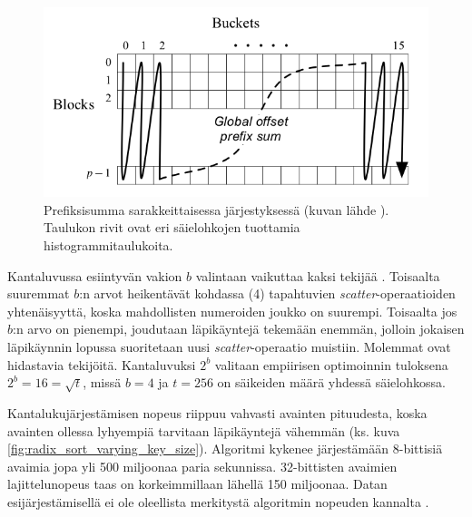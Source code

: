 \documentclass[a4paper,11pt]{article}
\newcommand{\engl}[1]{\foreignlanguage{english}{\em #1}}
\begin{document}
\begin{figure}
\centering
\includegraphics[scale = 0.5]{prefixsum}
\caption{Prefiksisumma sarakkeittaisessa järjestyksessä (kuvan lähde \cite{satish2009}). Taulukon rivit ovat eri säielohkojen tuottamia histogrammitaulukoita.}
\label{fig:columnscan}
\end{figure}

Kantaluvussa esiintyvän vakion $b$ valintaan vaikuttaa kaksi tekijää \cite{satish2009}. Toisaalta suuremmat $b$:n arvot heikentävät kohdassa (4) tapahtuvien \engl{scatter}-o\-pe\-raa\-ti\-oi\-den yhtenäisyyttä, koska mahdollisten numeroiden joukko on suurempi. Toisaalta jos $b$:n arvo on pienempi, joudutaan läpikäyntejä tekemään enemmän, jolloin jokaisen läpikäynnin lopussa suoritetaan uusi \engl{scatter}-operaatio muistiin. Molemmat ovat hidastavia tekijöitä. Kantaluvuksi $2^b$ valitaan empiirisen optimoinnin tuloksena $2^b = 16 = \sqrt{t}$, missä $b = 4$ ja $t = 256$ on säikeiden määrä yhdessä säielohkossa.

Kantalukujärjestämisen nopeus riippuu vahvasti avainten pituudesta, koska avainten ollessa lyhyempiä tarvitaan läpikäyntejä vähemmän (ks. kuva \ref{fig:radix_sort_varying_key_size}). Algoritmi kykenee järjestämään 8-bittisiä avaimia jopa yli 500 miljoonaa paria sekunnissa. 32-bittisten avaimien lajittelunopeus taas on korkeimmillaan lähellä 150 miljoonaa. Datan esijärjestämisellä ei ole oleellista merkitystä algoritmin nopeuden kannalta \cite{satish2009}.
\end{document}
